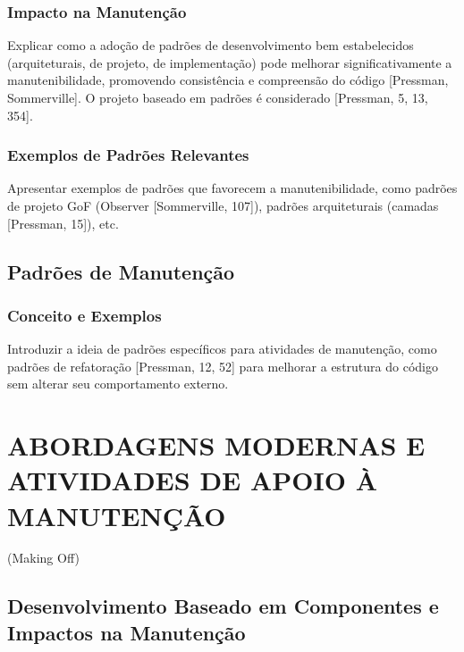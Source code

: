 \documentclass[
]{book}
\begin{document}
\subsection{Impacto na Manutenção}\label{impacto-na-manutenuxe7uxe3o}

Explicar como a adoção de padrões de desenvolvimento bem estabelecidos (arquiteturais, de projeto, de implementação) pode melhorar significativamente a manutenibilidade, promovendo consistência e compreensão do código {[}Pressman, Sommerville{]}. O projeto baseado em padrões é considerado {[}Pressman, 5, 13, 354{]}.

\subsection{Exemplos de Padrões Relevantes}\label{exemplos-de-padruxf5es-relevantes}

Apresentar exemplos de padrões que favorecem a manutenibilidade, como padrões de projeto GoF (Observer {[}Sommerville, 107{]}), padrões arquiteturais (camadas {[}Pressman, 15{]}), etc.

\section{Padrões de Manutenção}\label{padruxf5es-de-manutenuxe7uxe3o}

\subsection{Conceito e Exemplos}\label{conceito-e-exemplos}

Introduzir a ideia de padrões específicos para atividades de manutenção, como padrões de refatoração {[}Pressman, 12, 52{]} para melhorar a estrutura do código sem alterar seu comportamento externo.

\chapter{ABORDAGENS MODERNAS E ATIVIDADES DE APOIO À MANUTENÇÃO}\label{abordagens-modernas-e-atividades-de-apoio-uxe0-manutenuxe7uxe3o}

(Making Off)

\section{Desenvolvimento Baseado em Componentes e Impactos na Manutenção}\label{desenvolvimento-baseado-em-componentes-e-impactos-na-manutenuxe7uxe3o}
\end{document}
